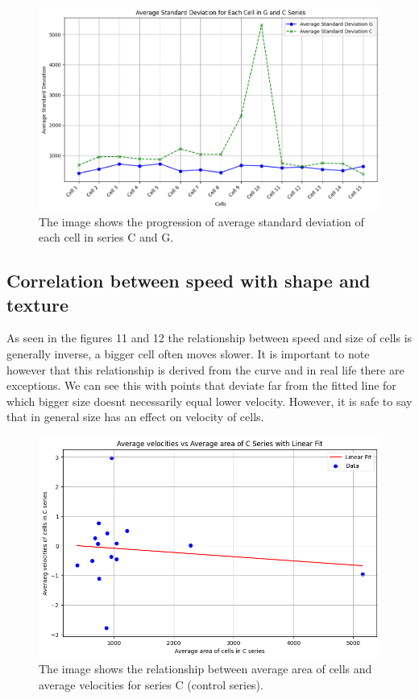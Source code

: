 \documentclass{article}
\begin{document}
\begin{figure}[h!]
\centering
\includegraphics[width=0.75\linewidth]{Report/RImages/Graphs/average_standard_deviation.png}
\caption{\label{fig:Mean_Distance}The image shows the progression of average standard deviation of each cell in series C and G.}
\end{figure}
\clearpage

\subsection*{Correlation between speed with shape and texture}

As seen in the figures 11 and 12 the relationship between speed and size of cells is generally inverse, a bigger cell often moves slower. It is important to note however that this relationship is derived from the curve and in real life there are exceptions. We can see this with points that deviate far from the fitted line for which bigger size doesnt necessarily equal lower velocity. However, it is safe to say that in general size has an effect on velocity of cells. 
\begin{figure}[h!]
\centering
\includegraphics[width=0.75\linewidth]{Report/RImages/Graphs/relationship_c.png}
\caption{\label{fig:Mean_Distance}The image shows the relationship between average area of cells and average velocities for series C (control series).}
\end{figure}
\end{document}
